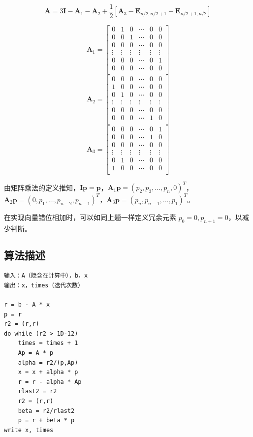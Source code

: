 \documentclass{ctexart}
\begin{document}
\[
\mathbf A= 3\mathbf I - \mathbf A_1 - \mathbf A_2 + \frac12\left[\mathbf A_3 - \mathbf E_{n/2,n/2+1} - \mathbf E_{n/2+1,n/2}\right]
\]

\[
\mathbf A_1 = 
\left[\begin{array}{cccccc}
0 & 1 & 0 & \cdots & 0 & 0 \\
0 & 0 & 1 & \cdots & 0 & 0 \\
0 & 0 & 0 & \cdots & 0 & 0 \\
\vdots & \vdots & \vdots & \vdots & \vdots & \vdots \\
0 & 0 & 0 & \cdots & 0 & 1 \\
0 & 0 & 0 & \cdots & 0 & 0\\
\end{array}\right]
\]
\[
\mathbf A_2 = 
\left[\begin{array}{cccccc}
0 & 0 & 0 & \cdots & 0 & 0 \\
1 & 0 & 0 & \cdots & 0 & 0 \\
0 & 1 & 0 & \cdots & 0 & 0 \\
\vdots & \vdots & \vdots & \vdots & \vdots & \vdots \\
0 & 0 & 0 & \cdots & 0 & 0 \\
0 & 0 & 0 & \cdots & 1 & 0\\
\end{array}\right]
\]
\[
\mathbf A_3 = 
\left[\begin{array}{cccccc}
0 & 0 & 0 & \cdots & 0 & 1 \\
0 & 0 & 0 & \cdots & 1 & 0 \\
0 & 0 & 0 & \cdots & 0 & 0 \\
\vdots & \vdots & \vdots & \vdots & \vdots & \vdots \\
0 & 1 & 0 & \cdots & 0 & 0 \\
1 & 0 & 0 & \cdots & 0 & 0\\
\end{array}\right]
\]

由矩阵乘法的定义推知，$\mathbf I\mathbf p=\mathbf p$，$\mathbf A_1\mathbf p=(p_2, p_3, ..., p_n, 0)^T$，$\mathbf A_2\mathbf p=(0, p_1, ..., p_{n-2}, p_{n-1})^T$，$\mathbf A_3\mathbf p=(p_n, p_{n-1}, ..., p_1)^T$。

在实现向量错位相加时，可以如同上题一样定义冗余元素 $p_0=0, p_{n+1}=0$，以减少判断。

\subsection{算法描述}
\begin{lstlisting}
输入：A（隐含在计算中），b，x
输出：x，times（迭代次数）

r = b - A * x
p = r
r2 = (r,r)
do while (r2 > 1D-12)
    times = times + 1
    Ap = A * p
    alpha = r2/(p,Ap)
    x = x + alpha * p
    r = r - alpha * Ap
    rlast2 = r2
    r2 = (r,r)
    beta = r2/rlast2
    p = r + beta * p
write x, times
\end{lstlisting}
\end{document}
